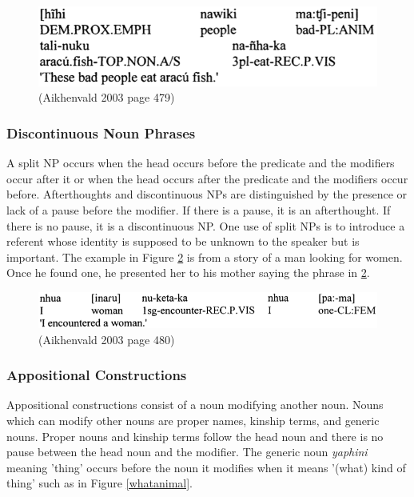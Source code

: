 \documentclass{article}
\begin{document}
\begin{figure}[h!]
  \centering
  \includegraphics[scale = 0.39]{aracufish.png}
    \caption{(Aikhenvald 2003 page 479)}
    \label{aracufish}
\end{figure}

\subsubsection{Discontinuous Noun Phrases}
A split NP occurs when the head occurs before the predicate and the modifiers occur after it or when the head occurs after the predicate and the modifiers occur before. Afterthoughts and discontinuous NPs are distinguished by the presence or lack of a pause before the modifier. If there is a pause, it is an afterthought. If there is no pause, it is a discontinuous NP. One use of split NPs is to introduce a referent whose identity is supposed to be unknown to the speaker but is important. The example in Figure \ref*{lookingforwomen} is from a story of a man looking for women. Once he found one, he presented her to his mother saying the phrase in \ref*{lookingforwomen}.

\begin{figure}[h!]
  \centering
  \includegraphics[scale = 0.4]{lookingforwomen.png}
    \caption{(Aikhenvald 2003 page 480)}
    \label{lookingforwomen}
\end{figure}

\subsubsection{Appositional Constructions}
Appositional constructions consist of a noun modifying another noun. Nouns which can modify other nouns are proper names, kinship terms, and generic nouns. Proper nouns and kinship terms follow the head noun and there is no pause between the head noun and the modifier. The generic noun \textit{yaphini} meaning 'thing' occurs before the noun it modifies when it means '(what) kind of thing' such as in Figure \ref*{whatanimal}.
\end{document}
